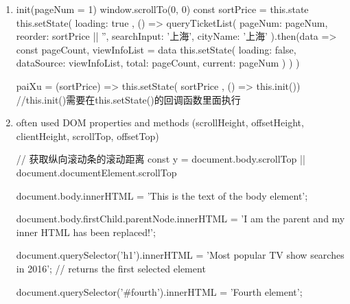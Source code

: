 \documentclass[a4paper,12pt]{article}
\begin{document}
\begin{enumerate}

\item 
\begin{jscode}
init(pageNum = 1) {
	window.scrollTo(0, 0)
	const { sortPrice } = this.state
	this.setState({
		loading: true
	}, () => {
		queryTicketList({
			pageNum: pageNum,
			reorder: sortPrice || '',
			searchInput: '上海',
			cityName: '上海'
		}).then(data => {
			const { pageCount, viewInfoList } = data
			this.setState({
				loading: false,
				dataSource: viewInfoList,
				total: pageCount,
				current: pageNum
			})
		})
	})
}

paiXu = (sortPrice) => {
	this.setState({ sortPrice }, () => this.init())  //this.init()需要在this.setState()的回调函数里面执行
}
\end{jscode}

\item often used DOM properties and methods (scrollHeight, offsetHeight, clientHeight, scrollTop, offsetTop)
\begin{jscode}
// 获取纵向滚动条的滚动距离
const y = document.body.scrollTop || document.documentElement.scrollTop

document.body.innerHTML = 'This is the text of the body element';

document.body.firstChild.parentNode.innerHTML = 'I am the parent and my inner HTML has been replaced!';

document.querySelector('h1').innerHTML = 'Most popular TV show searches in 2016'; // returns the first selected element

document.querySelector('#fourth').innerHTML = 'Fourth element';


\end{jscode}
\end{enumerate}
\end{document}
